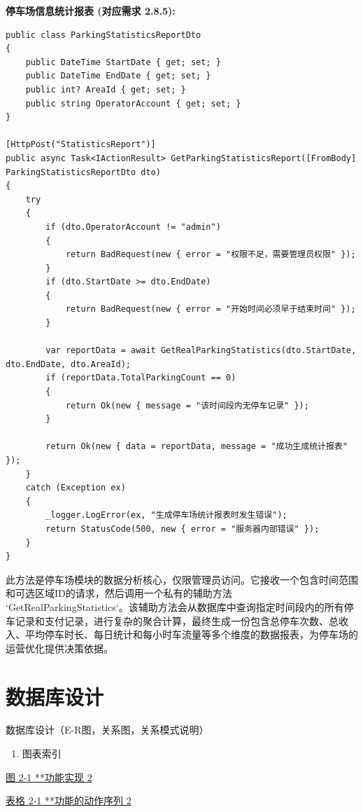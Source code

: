 \documentclass[]{article}
\begin{document}
\textbf{停车场信息统计报表 (对应需求 2.8.5):}
\begin{verbatim}
public class ParkingStatisticsReportDto
{
    public DateTime StartDate { get; set; }
    public DateTime EndDate { get; set; }
    public int? AreaId { get; set; }
    public string OperatorAccount { get; set; }
}

[HttpPost("StatisticsReport")]
public async Task<IActionResult> GetParkingStatisticsReport([FromBody] ParkingStatisticsReportDto dto)
{
    try
    {
        if (dto.OperatorAccount != "admin")
        {
            return BadRequest(new { error = "权限不足，需要管理员权限" });
        }
        if (dto.StartDate >= dto.EndDate)
        {
            return BadRequest(new { error = "开始时间必须早于结束时间" });
        }

        var reportData = await GetRealParkingStatistics(dto.StartDate, dto.EndDate, dto.AreaId);
        if (reportData.TotalParkingCount == 0)
        {
            return Ok(new { message = "该时间段内无停车记录" });
        }

        return Ok(new { data = reportData, message = "成功生成统计报表" });
    }
    catch (Exception ex)
    {
        _logger.LogError(ex, "生成停车场统计报表时发生错误");
        return StatusCode(500, new { error = "服务器内部错误" });
    }
}
\end{verbatim}
此方法是停车场模块的数据分析核心，仅限管理员访问。它接收一个包含时间范围和可选区域ID的请求，然后调用一个私有的辅助方法 `GetRealParkingStatistics`。该辅助方法会从数据库中查询指定时间段内的所有停车记录和支付记录，进行复杂的聚合计算，最终生成一份包含总停车次数、总收入、平均停车时长、每日统计和每小时车流量等多个维度的数据报表，为停车场的运营优化提供决策依据。

\hypertarget{ux6570ux636eux5e93ux8bbeux8ba1}{%
  \section{数据库设计}\label{ux6570ux636eux5e93ux8bbeux8ba1}}

数据库设计（E-R图，关系图，关系模式说明）

\begin{enumerate}
  \def\labelenumi{\Alph{enumi}.}
  \item
        \protect\hypertarget{_Toc153177886}{}{\protect\hypertarget{_Toc153186299}{}{\protect\hypertarget{_Toc155321769}{}{\protect\hypertarget{_Toc77076522}{}{}}}}图表索引
\end{enumerate}

\protect\hyperlink{_Toc394245023}{{图 2‑1 **功能实现} 2}

\protect\hyperlink{_Toc394245026}{{表格 2‑1 **功能的动作序列} 2}
\end{document}
